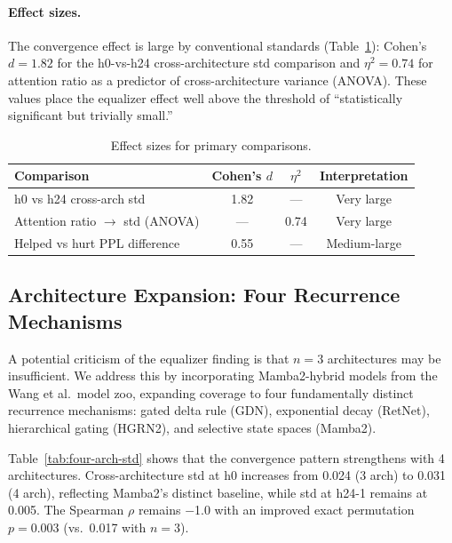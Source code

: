 \documentclass[11pt,a4paper]{article}
\begin{document}
\paragraph{Effect sizes.}
The convergence effect is large by conventional standards (Table~\ref{tab:effect-sizes}): Cohen's $d{=}1.82$ for the h0-vs-h24 cross-architecture std comparison and $\eta^2{=}0.74$ for attention ratio as a predictor of cross-architecture variance (ANOVA).
These values place the equalizer effect well above the threshold of ``statistically significant but trivially small.''

\begin{table}[t]
\centering
\small
\caption{Effect sizes for primary comparisons.}
\label{tab:effect-sizes}
\begin{tabular}{lccc}
\toprule
\textbf{Comparison} & \textbf{Cohen's $d$} & \textbf{$\eta^2$} & \textbf{Interpretation} \\
\midrule
h0 vs h24 cross-arch std           & 1.82 & --- & Very large \\
Attention ratio $\to$ std (ANOVA)  & ---  & 0.74 & Very large \\
Helped vs hurt PPL difference      & 0.55 & --- & Medium-large \\
\bottomrule
\end{tabular}
\end{table}

\subsection{Architecture Expansion: Four Recurrence Mechanisms}
\label{sec:arch-expansion}

A potential criticism of the equalizer finding is that $n{=}3$ architectures may be insufficient.
We address this by incorporating Mamba2-hybrid models from the Wang et al.\ model zoo, expanding coverage to four fundamentally distinct recurrence mechanisms: gated delta rule (GDN), exponential decay (RetNet), hierarchical gating (HGRN2), and selective state spaces (Mamba2).

Table~\ref{tab:four-arch-std} shows that the convergence pattern strengthens with 4 architectures.
Cross-architecture std at h0 increases from 0.024 (3 arch) to 0.031 (4 arch), reflecting Mamba2's distinct baseline, while std at h24-1 remains at 0.005.
The Spearman $\rho$ remains $-$1.0 with an improved exact permutation $p{=}0.003$ (vs.\ 0.017 with $n{=}3$).
\end{document}

